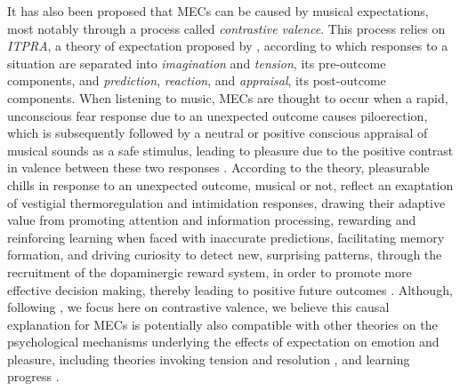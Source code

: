 It has also been proposed that MECs can be caused by musical expectations, most notably through a process called \emph{contrastive valence}. This process relies on \emph{ITPRA}, a theory of expectation proposed by \textcite{huron2006}, according to which responses to a situation are separated into \emph{imagination} and \emph{tension}, its pre-outcome components, and \emph{prediction}, \emph{reaction}, and \emph{appraisal}, its post-outcome components. When listening to music, MECs are thought to occur when a rapid, unconscious fear response due to an unexpected outcome causes piloerection, which is subsequently followed by a neutral or positive conscious appraisal of musical sounds as a safe stimulus, leading to pleasure due to the positive contrast in valence between these two responses \parencite{huron2006, huron2010}. According to the theory, pleasurable chills in response to an unexpected outcome, musical or not, reflect an exaptation of vestigial thermoregulation and intimidation responses, drawing their adaptive value from promoting attention and information processing, rewarding and reinforcing learning when faced with inaccurate predictions, facilitating memory formation, and driving curiosity to detect new, surprising patterns, through the recruitment of the dopaminergic reward system, in order to promote more effective decision making, thereby leading to positive future outcomes \parencite{altenmuller2013, cantor2019, grewe2007, huron2006, huron2010, maruskin2012, wassiliwizky2017b}. Although, following \textcite{huron2006}, we focus here on contrastive valence, we believe this causal explanation for MECs is potentially also compatible with other theories on the psychological mechanisms underlying the effects of expectation on emotion and pleasure, including theories invoking tension and resolution \parencite{meyer1956}, and learning progress \parencite{gold2019}.

